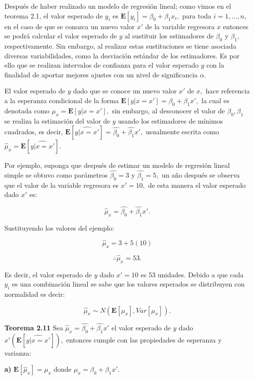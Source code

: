 \documentclass[a4paper,oneside,openany]{book}
\begin{document}
Después de haber realizado un modelo de regresión lineal; como vimos en
el teorema 2.1, el valor esperado de \(y_{i}\) es
\(\mathbf{E}[y_{i}]=\beta_{0}+\beta_{1}x_{i},\) para toda
\(i=1,\ldots,n,\) en el caso de que se conozca un nuevo valor \(x'\) de
la variable regresora \(x\) entonces se podrá calcular el valor esperado
de \(y\) al sustituir los estimadores de \(\beta_{0}\) y \(\beta_{1},\)
respectivamente. Sin embargo, al realizar estas sustituciones se tiene
asociada diversas variabilidades, como la desviación estándar de los
estimadores. Es por ello que se realizan intervalos de confianza para el
valor esperado \(y\) con la finalidad de aportar mejores ajustes con un
nivel de significancia \(\alpha.\)

El valor esperado de \(y\) dado que se conoce un nuevo valor \(x'\) de
\(x,\) hace referencia a la esperanza condicional de la forma
\(\mathbf{E}[y|x=x']=\beta_{0}+\beta_{1}x',\) la cual es denotada como
\(\mu_{x}=\mathbf{E}[y|x=x' ],\) sin embargo, al desconocer el valor de
\(\beta_{0},\beta_{1}\) se realiza la estimación del valor de \(y\)
usando los estimadores de mínimos cuadrados, es decir,
\(\mathbf{E}[\widehat{y|x=x'}]=\hat{\beta_{0}}+\hat{\beta_{1}}x',\)
usualmente escrita como \(\hat{\mu}_{x}=\mathbf{E}[\widehat{y|x=x'}].\)

Por ejemplo, suponga que después de estimar un modelo de regresión
lineal simple se obtuvo como parámetros \(\hat{\beta_{0}}=3\) y
\(\hat{\beta_{1}}=5,\) un año después se observa que el valor de la
variable regresora es \(x'=10,\) de esta manera el valor esperado dado
\(x'\) es:

\[\hat{\mu}_{x}=\hat{\beta_{0}}+\hat{\beta_{1}}x'.\]

Sustituyendo los valores del ejemplo:

\[\hat{\mu}_{x}=3+5(10)\]

\[\therefore \hat{\mu}_{x}=53.\]

Es decir, el valor esperado de \(y\) dado \(x'=10\) es 53 unidades.
Debido a que cada \(y_{i}\) es una combinación lineal se sabe que los
valores esperados se distribuyen con normalidad es decir:

\[\hat{\mu}_{x}\sim N(\mathbf{E}[\mu_{x}],Var[\mu_{x}]).\]

\textbf{Teorema 2.11} Sea
\(\hat{\mu}_{x}=\hat{\beta_{0}}+\hat{\beta_{1}}x'\) el valor esperado de
\(y\) dado \(x'\left( \mathbf{E}[\widehat{y|x=x'}]\right),\) entonces
cumple con las propiedades de esperanza y varianza:

\textbf{a)} \(\mathbf{E}[\hat{\mu}_{x}]=\mu_{x}\) donde
\(\mu_{x}=\beta_{0}+\beta_{1}x'.\)
\end{document}
